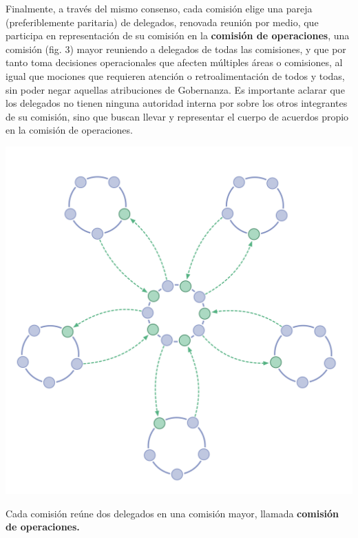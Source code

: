\documentclass[justified]{tufte-handout} %
\begin{document}
Finalmente, a través del mismo consenso, cada comisión elige una pareja (preferiblemente paritaria) de delegados, renovada reunión por medio, que participa en representación de su comisión en la \textbf{comisión de operaciones}, una comisión (fig. 3) mayor reuniendo a delegados de todas las comisiones, y que por tanto toma decisiones operacionales que afecten múltiples áreas o comisiones, al igual que mociones que requieren atención o retroalimentación de todos y todas, sin poder negar aquellas atribuciones de Gobernanza. Es importante aclarar que los delegados no tienen ninguna autoridad interna por sobre los otros integrantes de su comisión, sino que buscan llevar y representar el cuerpo de acuerdos propio en la comisión de operaciones.

\begin{marginfigure}[-200px]
	\includegraphics[width=\linewidth]{jerarquia.png}
	\caption{Cada comisión reúne dos delegados en una comisión mayor, llamada \textbf{comisión de operaciones.}}
	\label{fig:jerarquia}
\end{marginfigure}





\end{document}
